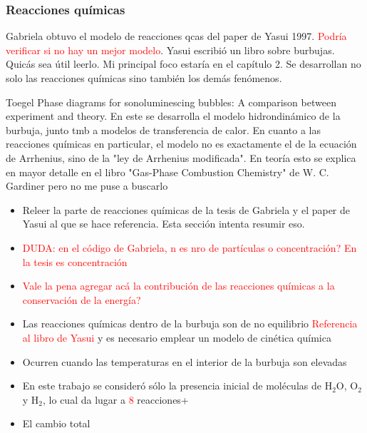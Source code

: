 \documentclass[aps,prb,twocolumn,superscriptaddress,floatfix,longbibliography,10pt]{revtex4-2}
\begin{document}
\subsubsection{Reacciones químicas}

Gabriela obtuvo el modelo de reacciones qcas del paper de Yasui 1997. \textcolor{red}{Podría verificar si no hay un mejor modelo}.
Yasui escribió un libro sobre burbujas. Quicás sea útil leerlo. Mi principal foco estaría en el capítulo 2. Se desarrollan no solo las reacciones químicas sino también los demás fenómenos.

Toegel Phase diagrams for sonoluminescing bubbles: A comparison between experiment and theory. En este se desarrolla el modelo hidrondinámico de la burbuja, junto tmb a modelos de transferencia de calor. En cuanto a las reacciones químicas en particular, el modelo no es exactamente el de la ecuación de Arrhenius, sino de la "ley de Arrhenius modificada". En teoría esto se explica en mayor detalle en el libro "Gas-Phase Combustion Chemistry" de W. C. Gardiner pero no me puse a buscarlo



\begin{itemize}
  \item Releer la parte de reacciones químicas de la tesis de Gabriela y el paper de Yasui al que se hace referencia. Esta sección intenta resumir eso.
  \item \textcolor{red}{DUDA: en el código de Gabriela, n es nro de partículas o concentración? En la tesis es concentración}
  \item \textcolor{red}{Vale la pena agregar acá la contribución de las reacciones químicas a la conservación de la energía?}
\end{itemize}


\begin{itemize}
  \item Las reacciones químicas dentro de la burbuja son de no equilibrio \textcolor{red}{Referencia al libro de Yasui} y es necesario emplear un modelo de cinética química
  \item Ocurren cuando las temperaturas en el interior de la burbuja son elevadas
  \item En este trabajo se consideró sólo la presencia inicial de moléculas de $\mathrm{H_2O}$, $\mathrm{O_2}$ y $\mathrm{H_2}$, lo cual da lugar a \textcolor{red}{8} reacciones+
  \item El cambio total 

\end{itemize}
\end{document}
